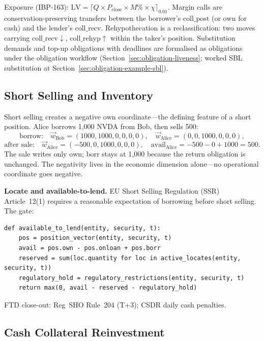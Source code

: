 Exposure (IBP-163): $\mathrm{LV} = \lceil Q\times P_{\mathrm{close}}\times M\%\times\chi\rceil_{0.01}$. Margin calls are conservation-preserving transfers between the borrower's $\mathrm{coll\_post}$ (or $\mathrm{own}$ for cash) and the lender's $\mathrm{coll\_recv}$. Rehypothecation is a reclassification: two moves carrying $\mathrm{coll\_recv}\downarrow$, $\mathrm{coll\_rehyp}\uparrow$ within the taker's position. Substitution demands and top-up obligations with deadlines are formalised as obligations under the obligation workflow (Section~\ref{sec:obligation-liveness}; worked SBL substitution at Section~\ref{sec:obligation-example-sbl}).

\subsection{Short Selling and Inventory}
\label{sec:sbl-short-selling}

Short selling creates a negative $\mathrm{own}$ coordinate---the defining feature of a short position. Alice borrows 1{,}000 NVDA from Bob, then sells 500:
\[
\text{borrow:}\quad \vec{w}_{\mathrm{Bob}} = (1000,1000,0,0,0,0),\quad \vec{w}_{\mathrm{Alice}} = (0,0,1000,0,0,0),
\]
\[
\text{after sale:}\quad \vec{w}_{\mathrm{Alice}} = (-500,0,1000,0,0,0),\quad \mathrm{avail}_{\mathrm{Alice}} = -500-0+1000 = 500.
\]
The sale writes only $\mathrm{own}$; $\mathrm{borr}$ stays at 1{,}000 because the return obligation is unchanged. The negativity lives in the economic dimension alone---no operational coordinate goes negative.

\noindent\textbf{Locate and available-to-lend.} EU Short Selling Regulation (SSR) Article~12(1) requires a reasonable expectation of borrowing before short selling. The gate:
\begin{lstlisting}
def available_to_lend(entity, security, t):
    pos = position_vector(entity, security, t)
    avail = pos.own - pos.onloan + pos.borr
    reserved = sum(loc.quantity for loc in active_locates(entity, security, t))
    regulatory_hold = regulatory_restrictions(entity, security, t)
    return max(0, avail - reserved - regulatory_hold)
\end{lstlisting}
FTD close-out: Reg~SHO Rule~204 (T+3); CSDR daily cash penalties.

\subsection{Cash Collateral Reinvestment}
\label{sec:sbl-reinvestment}

